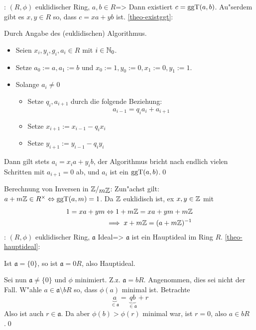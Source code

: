 \theorem: $(R,\phi)$ euklidischer Ring, $a,b\in R$=>{
  \label{theo-existggt}
  Dann existiert $c=\operatorname{ggT}(a,b)$. Au"serdem gibt es $x,y\in R$ so, dass 
  $c=xa+yb$ ist.
  }
\proof\ref{theo-existggt}:{
  Durch Angabe des (euklidischen) Algorithmus. 
  \begin{itemize}
    \item Seien $x_i,y_i,g_i,a_i\in R$ mit $i\in\mathbb N_0$.
    \item Setze $a_0:=a,a_1:=b$ und $x_0:=1,y_0:=0,x_1:=0,y_1:=1$.
    \item Solange $a_i\ne 0$
    \begin{itemize}
      \item Setze $q_i,a_{i+1}$ durch die folgende Beziehung:
        \[a_{i-1}=q_ia_i+a_{i+1}
          \]
      \item Setze $x_{i+1}:=x_{i-1}-q_ix_i$
      \item Setze $y_{i+1}:=y_{i-1}-q_iy_i$
      \end{itemize}
    \end{itemize}
  Dann  gilt stets $a_i=x_ia+y_ib$, der Algorithmus bricht nach endlich
  vielen Schritten mit $a_{i+1}=0$ ab, und $a_i$ ist ein $\operatorname{ggT}(a,b)$.\qed
  }
\remark Berechnung von Inversen in $\rcoset \SetZ {m\SetZ}$:{
  Zun"achst gilt: $a+m\mathbb Z\in R^\times \Leftrightarrow \operatorname{ggT}(a,m)=1$. 
  Da $\mathbb Z$ euklidisch ist, ex $x,y\in\mathbb Z$ mit
  \begin{align*}
    1=xa+ym&\Leftrightarrow 1+m\mathbb Z=xa+ym+m\mathbb Z \\
    &\implies x+m\mathbb Z = (a+m\mathbb Z)^{-1}
    \end{align*}
  }
\theorem: $(R,\phi)$ euklidischer Ring, $\mathfrak a$ Ideal=>{
  \label{theo-hauptideal}
  $\mathfrak a$ ist ein Hauptideal im Ring $R$.
  }
\proof\ref{theo-hauptideal}:{
  Ist $\mathfrak a=\{0\}$, so ist $\mathfrak a=0R$, also Hauptideal.
  
  Sei nun $\mathfrak a\ne\{0\}$ und $\phi$ minimiert. 
  Z.z. $\mathfrak a=bR$. Angenommen, dies sei nicht der Fall. W"ahle
  $a\in\mathfrak a\setminus bR$ so, dass $\phi(a)$ minimal ist.
  Betrachte 
  \[\underbrace{a}_{\in \mathfrak a}=\underbrace{qb}_{\in \mathfrak a}+r
    \]
  Also ist auch $r\in\mathfrak a$. Da aber $\phi(b)>\phi(r)$ minimal war, 
  ist $r=0$, also $a\in bR$.\qed
  }
